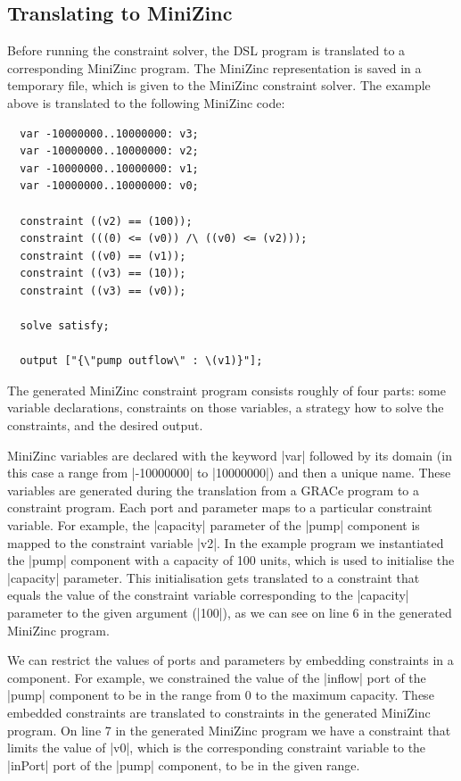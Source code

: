 \documentclass{article}
\begin{document}
\subsection{Translating to MiniZinc}

Before running the constraint solver, the DSL program is translated to
a corresponding MiniZinc program.
%
The MiniZinc representation is saved in a temporary file, which is
given to the MiniZinc constraint solver.
%
The example above is translated to the following MiniZinc code:
%
\begin{verbatim}
  var -10000000..10000000: v3;
  var -10000000..10000000: v2;
  var -10000000..10000000: v1;
  var -10000000..10000000: v0;

  constraint ((v2) == (100));
  constraint (((0) <= (v0)) /\ ((v0) <= (v2)));
  constraint ((v0) == (v1));
  constraint ((v3) == (10));
  constraint ((v3) == (v0));

  solve satisfy;

  output ["{\"pump outflow\" : \(v1)}"];
\end{verbatim}
%
The generated MiniZinc constraint program consists roughly of four
parts: some variable declarations, constraints on those variables, a
strategy how to solve the constraints, and the desired output.

MiniZinc variables are declared with the keyword |var| followed by its
domain (in this case a range from |-10000000| to |10000000|) and then
a unique name.
%
These variables are generated during the translation from a GRACe
program to a constraint program.
%
Each port and parameter maps to a particular constraint variable.
%
For example, the |capacity| parameter of the |pump| component is
mapped to the constraint variable |v2|.
%
In the example program we instantiated the |pump| component with a
capacity of 100 units, which is used to initialise the |capacity|
parameter.
%
This initialisation gets translated to a constraint that equals the
value of the constraint variable corresponding to the |capacity|
parameter to the given argument (|100|), as we can see on line 6 in
the generated MiniZinc program.

We can restrict the values of ports and parameters by embedding
constraints in a component.
%
For example, we constrained the value of the |inflow| port of the
|pump| component to be in the range from 0 to the maximum capacity.
%
These embedded constraints are translated to constraints in the
generated MiniZinc program.
%
On line 7 in the generated MiniZinc program we have a constraint that
limits the value of |v0|, which is the corresponding constraint
variable to the |inPort| port of the |pump| component, to be in the
given range.
\end{document}
